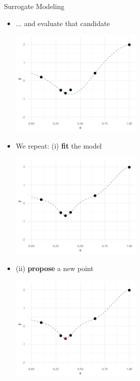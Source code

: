 \documentclass[11pt,compress,t,notes=noshow, xcolor=table]{beamer}
\begin{document}
\begin{vbframe}{Surrogate Modeling}
\begin{itemize}
\framebreak

\item ... and evaluate that candidate
\vspace{+.45cm}

\begin{center}
  \includegraphics[width = 0.5\textwidth]{figure_man/loop_7.png}
\end{center}

\framebreak

\item We repeat: (i) \textbf{fit} the model
\vspace{+.45cm}

\begin{center}
  \includegraphics[width = 0.5\textwidth]{figure_man/loop_8.png}
\end{center}

\framebreak

\item (ii) \textbf{propose} a new point
\vspace{+.45cm}

\begin{center}
  \includegraphics[width = 0.5\textwidth]{figure_man/loop_9.png}
\end{center}


\end{itemize}
\end{vbframe}
\end{document}
